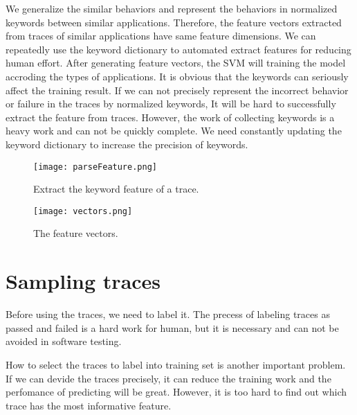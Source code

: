 We generalize the similar behaviors and represent the behaviors in normalized keywords between similar applications.
Therefore, the feature vectors extracted from traces of similar applications have same feature dimensions.
We can repeatedly use the keyword dictionary to automated extract features for reducing human effort.
After generating feature vectors, the SVM will training the model accroding the types of applications.
It is obvious that the keywords can seriously affect the training result.
If we can not precisely represent the incorrect behavior or failure in the traces by normalized keywords,
It will be hard to successfully extract the feature from traces.
However, the work of collecting keywords is a heavy work and can not be quickly complete.
We need constantly updating the keyword dictionary to increase the precision of keywords.

\begin{figure}[ht]
	\graphicspath{{pic/}}
	\begin{center}
		\texttt{[image: parseFeature.png]}
	\end{center}
	\caption{ Extract the keyword feature of a trace. }
	\label{parseFeature}
\end{figure}

\begin{figure}[ht]
	\graphicspath{{pic/}}
	\begin{center}
		\texttt{[image: vectors.png]}
	\end{center}
	\caption{ The feature vectors. }
	\label{featureVectors}
\end{figure}


\clearpage

\section{Sampling traces}

Before using the traces, we need to label it.
The precess of labeling traces as passed and failed is a hard work for human,
but it is necessary and can not be avoided in software testing.

How to select the traces to label into training set is another important problem.
If we can devide the traces precisely,
it can reduce the training work and the perfomance of predicting will be great.
However, it is too hard to find out which trace has the most informative feature.

